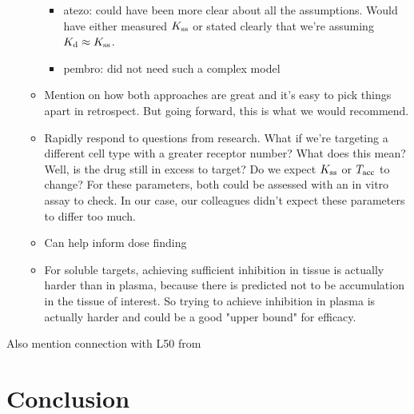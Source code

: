 \begin{itemize}
\begin{itemize}
		\begin{itemize}
			\item atezo: could have been more clear about all the assumptions.  Would have either measured $K_\text{ss}$ or stated clearly that we're assuming $K_\text{d} \approx K_\text{ss}$.
			\item pembro: did not need such a complex model
		\end{itemize}
		\item Mention on how both approaches are great and it's easy to pick things apart in retrospect.  But going forward, this is what we would recommend.
		\item Rapidly respond to questions from research.  What if we're targeting a different cell type with a greater receptor number?  What does this mean?  Well, is the drug still in excess to target?  Do we expect $K_\text{ss}$ or $T_\text{acc}$ to change?  For these parameters, both could be assessed with an in vitro assay to check.  In our case, our colleagues didn't expect these parameters to differ too much. 
		\item Can help inform dose finding
		\item For soluble targets, achieving sufficient inhibition in tissue is actually harder than in plasma, because there is predicted not to be accumulation in the tissue of interest.  So trying to achieve inhibition in plasma is actually harder and could be a good "upper bound" for efficacy.
	\end{itemize}
\end{itemize}

Also mention connection with L50 from \cite{gabrielsson17}

\section{Conclusion}